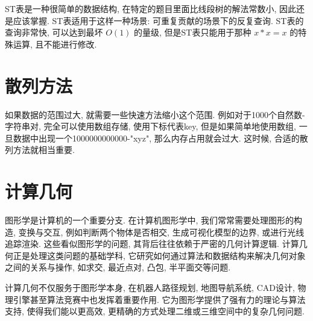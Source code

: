 \documentclass[a4paper]{ctexart}
\begin{document}
ST表是一种很简单的数据结构, 在特定的题目里面比线段树的解法常数小, 因此还是应该掌握. ST表适用于这样一种场景: 可重复贡献的场景下的反复查询. ST表的查询非常快, 可以达到最坏 $O(1)$ 的量级, 但是ST表只能用于那种 $x*x=x$ 的特殊运算, 且不能进行修改.



\section{散列方法}

如果数据的范围过大, 就需要一些快速方法缩小这个范围. 例如对于1000个自然数-字符串对, 完全可以使用数组存储, 使用下标代表key, 但是如果简单地使用数组, 一旦数据中出现一个1000000000000-"xyz", 那么内存占用就会过大. 这时候, 合适的散列方法就相当重要.



\section{计算几何}

图形学是计算机的一个重要分支. 在计算机图形学中, 我们常常需要处理图形的构造, 变换与交互, 例如判断两个物体是否相交, 生成可视化模型的边界, 或进行光线追踪渲染. 这些看似图形学的问题, 其背后往往依赖于严密的几何计算逻辑. 计算几何正是处理这类问题的基础学科, 它研究如何通过算法和数据结构来解决几何对象之间的关系与操作, 如求交, 最近点对, 凸包, 半平面交等问题.

计算几何不仅服务于图形学本身, 在机器人路径规划, 地图导航系统, CAD设计, 物理引擎甚至算法竞赛中也发挥着重要作用. 它为图形学提供了强有力的理论与算法支持, 使得我们能以更高效, 更精确的方式处理二维或三维空间中的复杂几何问题.


\end{document}
